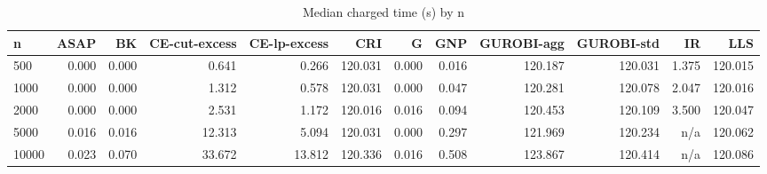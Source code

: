 \begin{table}[htbp]
\centering
\small
\caption{Median charged time (s) by n}
\label{tab:E6_scalability_scaling}
\begin{tabular}{lrrrrrrrrrrr}
\toprule
n & ASAP & BK & CE-cut-excess & CE-lp-excess & CRI & G & GNP & GUROBI-agg & GUROBI-std & IR & LLS \\
\midrule
500 & 0.000 & 0.000 & 0.641 & 0.266 & 120.031 & 0.000 & 0.016 & 120.187 & 120.031 & 1.375 & 120.015 \\
1000 & 0.000 & 0.000 & 1.312 & 0.578 & 120.031 & 0.000 & 0.047 & 120.281 & 120.078 & 2.047 & 120.016 \\
2000 & 0.000 & 0.000 & 2.531 & 1.172 & 120.016 & 0.016 & 0.094 & 120.453 & 120.109 & 3.500 & 120.047 \\
5000 & 0.016 & 0.016 & 12.313 & 5.094 & 120.031 & 0.000 & 0.297 & 121.969 & 120.234 & n/a & 120.062 \\
10000 & 0.023 & 0.070 & 33.672 & 13.812 & 120.336 & 0.016 & 0.508 & 123.867 & 120.414 & n/a & 120.086 \\
\bottomrule
\end{tabular}
\end{table}

